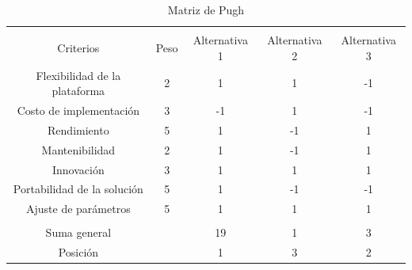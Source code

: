 \documentclass[12pt]{article}
\begin{document}
\begin{table}[h!]
  \caption{Matriz de Pugh}{
  \label{tab:matriz_de_pugh}
  \begin{tabular}{ccccc}
  \hline
  \multicolumn{1}{|c|}{\cellcolor[HTML]{93C47D}} &
    \multicolumn{1}{c|}{\cellcolor[HTML]{93C47D}} &
    \multicolumn{1}{c|}{\cellcolor[HTML]{93C47D}} &
    \multicolumn{1}{c|}{\cellcolor[HTML]{93C47D}} &
    \multicolumn{1}{c|}{\cellcolor[HTML]{93C47D}} \\
  \multicolumn{1}{|c|}{\multirow{-2}{*}{\cellcolor[HTML]{93C47D} Criterios}} &
    \multicolumn{1}{c|}{\multirow{-2}{*}{\cellcolor[HTML]{93C47D} Peso}} &
    \multicolumn{1}{c|}{\multirow{-2}{*}{\cellcolor[HTML]{93C47D} Alternativa 1}} &
    \multicolumn{1}{c|}{\multirow{-2}{*}{\cellcolor[HTML]{93C47D} Alternativa 2}} &
    \multicolumn{1}{c|}{\multirow{-2}{*}{\cellcolor[HTML]{93C47D} Alternativa 3}} \\ \hline
  \multicolumn{1}{|c|}{\cellcolor[HTML]{93C47D} Flexibilidad de la plataforma} &
    \multicolumn{1}{c|}{2} &
    \multicolumn{1}{c|}{1} &
    \multicolumn{1}{c|}{1} &
    \multicolumn{1}{c|}{-1} \\ \hline
  \multicolumn{1}{|c|}{\cellcolor[HTML]{93C47D} Costo de implementación} &
    \multicolumn{1}{c|}{3} &
    \multicolumn{1}{c|}{-1} &
    \multicolumn{1}{c|}{1} &
    \multicolumn{1}{c|}{-1} \\ \hline
  \multicolumn{1}{|c|}{\cellcolor[HTML]{93C47D} Rendimiento} &
    \multicolumn{1}{c|}{5} &
    \multicolumn{1}{c|}{1} &
    \multicolumn{1}{c|}{-1} &
    \multicolumn{1}{c|}{1} \\ \hline
  \multicolumn{1}{|c|}{\cellcolor[HTML]{93C47D} Mantenibilidad} &
    \multicolumn{1}{c|}{2} &
    \multicolumn{1}{c|}{1} &
    \multicolumn{1}{c|}{-1} &
    \multicolumn{1}{c|}{1} \\ \hline
  \multicolumn{1}{|c|}{\cellcolor[HTML]{93C47D} Innovación} &
    \multicolumn{1}{c|}{3} &
    \multicolumn{1}{c|}{1} &
    \multicolumn{1}{c|}{1} &
    \multicolumn{1}{c|}{1} \\ \hline
  \multicolumn{1}{|c|}{\cellcolor[HTML]{93C47D} Portabilidad de la solución} &
    \multicolumn{1}{c|}{5} &
    \multicolumn{1}{c|}{1} &
    \multicolumn{1}{c|}{-1} &
    \multicolumn{1}{c|}{-1} \\ \hline
  \multicolumn{1}{|c|}{\cellcolor[HTML]{93C47D} Ajuste de parámetros} &
    \multicolumn{1}{c|}{5} &
    \multicolumn{1}{c|}{1} &
    \multicolumn{1}{c|}{1} &
    \multicolumn{1}{c|}{1} \\ \hline
  \multicolumn{1}{l}{} &
    \multicolumn{1}{l}{} &
    \multicolumn{1}{l}{} &
    \multicolumn{1}{l}{} &
    \multicolumn{1}{l}{} \\ \hline
  \multicolumn{1}{|c|}{\cellcolor[HTML]{93C47D} Suma general} &
    \multicolumn{1}{l|}{} &
    \multicolumn{1}{c|}{19} &
    \multicolumn{1}{c|}{1} &
    \multicolumn{1}{c|}{3} \\ \hline
  \multicolumn{1}{|c|}{\cellcolor[HTML]{93C47D} Posición} &
    \multicolumn{1}{l|}{} &
    \multicolumn{1}{c|}{1} &
    \multicolumn{1}{c|}{3} &
    \multicolumn{1}{c|}{2} \\ \hline
  \end{tabular}%
  }
  \end{table}
\end{document}
